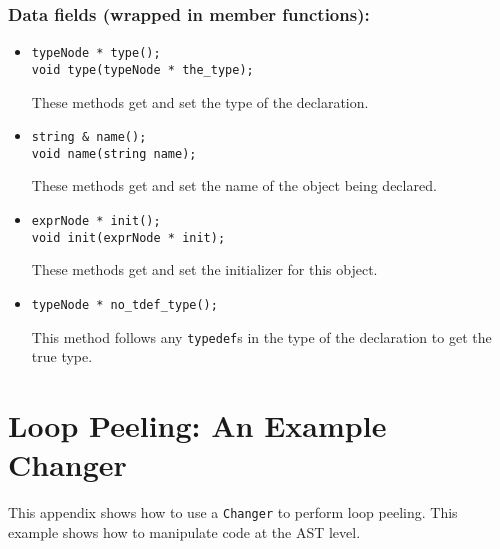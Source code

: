 \documentclass[10pt]{article}
\begin{document}
\subsubsection*{Data fields (wrapped in member functions):} 

\begin{itemize}
\item
\begin{small}
\begin{verbatim}
typeNode * type();
void type(typeNode * the_type);
\end{verbatim}
\end{small}

These methods get and set the type of the declaration.

\item

\begin{small}
\begin{verbatim}
string & name();
void name(string name);
\end{verbatim}
\end{small}

These methods get and set the name of the object being declared.

\item
\begin{small}
\begin{verbatim}
exprNode * init();
void init(exprNode * init);
\end{verbatim}
\end{small}

These methods get and set the initializer for this object.  

\item
\begin{small}
\begin{verbatim}
typeNode * no_tdef_type();
\end{verbatim}
\end{small}

This method follows any {\tt typedef}s in the type of the declaration to get
the true type.

\end{itemize}


\appendix

\section{Loop Peeling: An Example Changer}

This appendix shows how to use a {\tt Changer} to perform loop peeling.  This
example shows how to manipulate code at the AST level.
\end{document}
